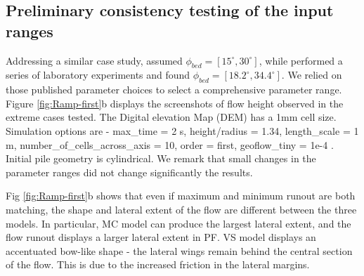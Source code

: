 \documentclass{article}
\begin{document}
\subsection{Preliminary consistency testing of the input ranges}\label{consistency}
Addressing a similar case study, \citep{Dalbey2008} assumed $\phi_{bed}=[15^\mathrm{\circ}, 30^\mathrm{\circ}]$, while \citep{Patra2005, WebbBursik2016} performed a series of laboratory experiments and found $\phi_{bed}=[18.2^\mathrm{\circ}, 34.4^\mathrm{\circ}]$. We relied on those published parameter choices to select a comprehensive parameter range. Figure \ref{fig:Ramp-first}b displays the screenshots of flow height observed in the extreme cases tested. The Digital elevation Map (DEM) has a 1mm cell size. Simulation options are - max\_time = 2 s, height/radius = 1.34, length\_scale = 1 m, number\_of\_cells\_across\_axis = 10, order = first, geoflow\_tiny = 1e-4 \citep{Patra2005,Aghakhani2016}. Initial pile geometry is cylindrical. We remark that small changes in the parameter ranges did not change significantly the results.


Fig \ref{fig:Ramp-first}b shows that even if maximum and minimum runout are both matching, the shape and lateral extent of the flow are different between the three models. In particular, MC model can produce the largest lateral extent, and the flow runout displays a larger lateral extent in PF. VS model displays an accentuated bow-like shape - the lateral wings remain behind the central section of the flow. This is due to the increased friction in the lateral margins.
\end{document}
